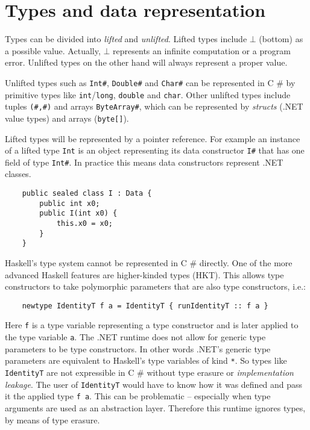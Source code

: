 \documentclass[en]{pracamgr}
\newcommand{\shrp}{%
  {\fontfamily{ppl}\selectfont\#%
  }}
\begin{document}
\section{Types and data representation}\label{s:data_rep}

Types can be divided into \textit{lifted} and \textit{unlifted}.
Lifted types include $\bot$ (bottom) as a possible value.
Actually, $\bot$ represents an infinite computation or
a program error. Unlifted types on the other hand will
always represent a proper value.

Unlifted types such as \texttt{Int\#}, \texttt{Double\#}
and \texttt{Char\#} can be represented in C\shrp{} by
primitive types like \texttt{int}/\texttt{long}, \texttt{double} and \texttt{char}.
Other unlifted types include tuples \texttt{(\#,\#)} and
arrays \texttt{ByteArray\#}, which can be represented by
\textit{structs} (.NET value types) and arrays (\texttt{byte[]}).

Lifted types will be represented by a pointer reference.
For example an instance of a lifted type \texttt{Int} is an object representing
its data constructor \texttt{I\#} that has one field of type \texttt{Int\#}.
In practice this means data constructors represent .NET classes.

\begin{verbatim}
    public sealed class I : Data {
        public int x0;
        public I(int x0) {
            this.x0 = x0;
        }
    }
\end{verbatim}

Haskell's type system cannot be represented in C\shrp{} directly.
One of the more advanced Haskell features are higher-kinded types (HKT).
This allows type constructors to take polymorphic parameters
that are also type constructors, i.e.:

\begin{verbatim}
    newtype IdentityT f a = IdentityT { runIdentityT :: f a }
\end{verbatim}

Here \texttt{f} is a type variable representing a type constructor
and is later applied to the type variable \texttt{a}.
The .NET runtime does not allow for generic type parameters to be
type constructors. In other words .NET's generic type parameters are
equivalent to Haskell's type variables of kind \texttt{*}.
So types like \texttt{IdentityT} are not
expressible in C\shrp{} without type erasure or \textit{implementation leakage}.
The user of \texttt{IdentityT} would have to know how it
was defined and pass it the applied type \texttt{f a}. This can be
problematic -- especially when type arguments are used as an abstraction layer.
Therefore this runtime ignores types, by
means of type erasure.
\end{document}
